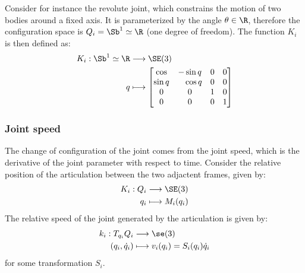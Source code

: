 Consider for instance the revolute joint, which constrains the motion of two bodies around a fixed axis. It is parameterized by the angle $\theta\in\R$, therefore the configuration space is $Q_i=\Sb^1\simeq\R$ (one degree of freedom). The function $K_i$ is then defined as:
\begin{equation*}
    \begin{aligned}
        K_i: \Sb^1\simeq\R &\longrightarrow \SE(3)\\
        q &\longmapsto \begin{bmatrix}
            \cos  & -\sin q & 0 & 0\\
            \sin q & \phantom{-}\cos q & 0 & 0\\
            0 & 0 & 1 & 0\\
            0 & 0 & 0 & 1
        \end{bmatrix}
    \end{aligned}
\end{equation*}

\subsubsection{Joint speed}
The change of configuration of the joint comes from the joint speed, which is the derivative of the joint parameter with respect to time. Consider the relative position of the articulation between the two adjactent frames, given by:
\begin{equation*}
    \begin{aligned}
        K_i : Q_i &\longrightarrow \SE(3)\\
        q_i &\longmapsto M_i(q_i)
    \end{aligned}
\end{equation*}
The relative speed of the joint generated by the articulation is given by:
\begin{equation*}
    \begin{aligned}
        k_i:T_{q_i}Q_i &\longrightarrow \se(3)\\
        (q_i, \dot{q}_i) &\longmapsto v_i(q_i) = S_i(q_i)\dot{q}_i
    \end{aligned}
\end{equation*}
for some transformation $S_i$.

